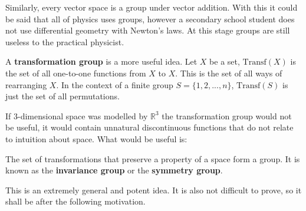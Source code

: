Similarly, every vector space is a group under vector addition. With this it could be said that all of physics uses groups, however a secondary school student does not use differential geometry with Newton's laws. At this stage groups are still useless to the practical physicist.

A \textbf{transformation group} is a more useful idea. Let $X$ be a set, $\mathrm{Transf}(X)$ is the set of all one-to-one functions from $X$ to $X$. This is the set of all ways of rearranging $X$. In the context of a finite group $S=\{1,2,...,n\}$, $\mathrm{Transf}(S)$ is just the set of all permutations.

If $3$-dimensional space was modelled by $\mathbb{R}^3$ the transformation group would not be useful, it would contain unnatural discontinuous functions that do not relate to intuition about space. What would be useful is:
\begin{center}
The set of transformations that preserve a property of a space form a group. It is known as the \textbf{invariance group} or the \textbf{symmetry group}.
\end{center}
 This is an extremely general and potent idea. It is also not difficult to prove, so it shall be after the following motivation.
 

